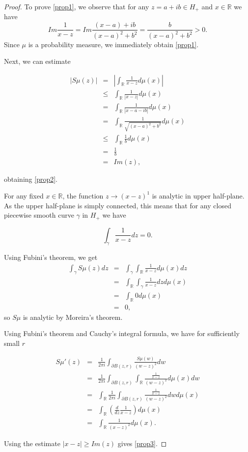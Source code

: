\documentclass[12pt,a4paper,leqno]{report}
\newcommand{\R}{\mathbb{R}}
\theoremstyle{plain}
\theoremstyle{definition}
\theoremstyle{remark}
\begin{document}
\begin{proof}
To prove \ref{prop1}, we observe that for any $z = a + ib \in H_+$ and $x \in \R$ we have
\begin{equation*}
Im\frac{1}{x-z} = Im\frac{(x-a) +ib}{(x-a)^2+b^2} = \frac{b}{(x-a)^2+b^2} > 0.
\end{equation*}
Since $\mu$ is a probability measure, we immediately obtain \ref{prop1}.

Next, we can estimate

\begin{eqnarray*}
|S\mu(z)| & = & \left| \int_{\R} \frac{1}{x-z} d \mu(x)  \right|\\
& \leq & \int_{\R} \frac{1}{|x-z|} d \mu(x)\\
& = & \int_{\R} \frac{1}{|x-a-ib|} d \mu(x)\\
& = & \int_{\R} \frac{1}{\sqrt{(x-a)^2+b^2}} d \mu(x)\\
& \leq & \int_{\R} \frac{1}{b} d \mu(x)\\
& = & \frac{1}{b}\\
& = & Im(z),
\end{eqnarray*}

obtaining \ref{prop2}.

For any fixed $x \in \R$, the function $z \to (x-z)^1$ is analytic in upper half-plane. As the upper half-plane is simply connected, this means that for any closed piecewise smooth curve $\gamma$ in $H_+$ we have

\begin{equation*}
\int_{\gamma} \frac{1}{x-z}dz = 0.
\end{equation*}

Using Fubini's theorem, we get
\begin{eqnarray*}
\int_\gamma S\mu(z) dz & = & 
\int_{\gamma} \int_{\R} \frac{1}{x-z} d\mu(x) dz\\
& = & \int_{\R} \int_{\gamma} \frac{1}{x-z} dz d\mu(x)\\
& = & \int_{\R} 0 d\mu(x)\\
& = & 0,
\end{eqnarray*}
so $S\mu$ is analytic by Moreira's theorem.

Using Fubini's theorem and Cauchy's integral formula, we have for sufficiently small $r$ 

\begin{eqnarray*}
S\mu '(z) & = & \frac{1}{2\pi i}
\int_{\partial B(z,r)} \frac{S\mu(w)}{(w - z)^2} dw\\
& = & \frac{1}{2\pi i}
\int_{\partial B(z,r)} \int_{\R} \frac{\frac{1}{x-z}}{(w - z)^2} d\mu(x) dw\\
& = &
\int_{\R} \frac{1}{2\pi i} \int_{\partial B(z,r)} \frac{\frac{1}{x-z}}{(w - z)^2} dw d\mu(x)\\
& = & \int_{\R} \left( \frac{d}{dz} \frac{1}{x-z} \right) d\mu(x)\\
& = & \int_{\R}\frac{1}{(x-z)^2} d\mu(x).
\end{eqnarray*}

Using the estimate $|x-z| \geq Im(z)$ gives \ref{prop3}.

\end{proof}
\end{document}
